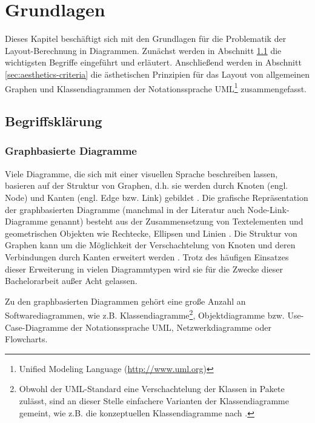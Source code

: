 
\chapter{Grundlagen}

Dieses Kapitel beschäftigt sich mit den Grundlagen für die Problematik der Layout-Berechnung in Diagrammen. Zunächst werden in Abschnitt \ref{sec:disambiguation} die wichtigsten Begriffe eingeführt und erläutert. Anschließend werden in Abschnitt \ref{sec:aesthetics-criteria} die ästhetischen Prinzipien für das Layout von allgemeinen Graphen und Klassendiagrammen der Notationssprache UML\footnote{Unified Modeling Language (\url{http://www.uml.org})} zusammengefasst.

\section{Begriffsklärung}
\label{sec:disambiguation}

\subsection{Graphbasierte Diagramme}
\label{subsec:graph-based-diagrams}

Viele Diagramme, die sich mit einer visuellen Sprache beschreiben lassen, basieren auf der Struktur von Graphen, d.h. sie werden durch Knoten (engl. Node) und Kanten (engl. Edge bzw. Link) gebildet \cite{Eichelberger05Aesthetics}. Die grafische Repräsentation der graphbasierten Diagramme (manchmal in der Literatur auch Node-Link-Diagramme genannt) besteht aus der Zusammensetzung von Textelementen und geometrischen Objekten wie Rechtecke, Ellipsen und Linien \cite{Wybrow08Using}. Die Struktur von Graphen kann um die Möglichkeit der Verschachtelung von Knoten und deren Verbindungen durch Kanten erweitert werden \cite{Siebenhaller03Automatisches, Wybrow08Using}. Trotz des häufigen Einsatzes dieser Erweiterung in vielen Diagrammtypen wird sie für die Zwecke dieser Bachelorarbeit außer Acht gelassen.

Zu den graphbasierten Diagrammen gehört eine große Anzahl an Softwarediagrammen, wie z.B. Klassendiagramme\footnote{Obwohl der UML-Standard eine Verschachtelung der Klassen in Pakete zulässt, sind an dieser Stelle einfachere Varianten der Klassendiagramme gemeint, wie z.B. die konzeptuellen Klassendiagramme nach \cite{Ambler04UML-2-Class}.}, Objektdiagramme bzw. Use-Case-Diagramme der Notationssprache UML, Netzwerkdiagramme oder Flowcharts.

